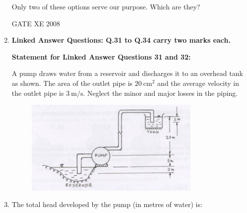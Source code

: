 \documentclass[12pt]{article}
\begin{document}
\begin{enumerate}[label=Q\arabic*.]
Only two of these options serve our purpose. Which are they?  

\begin{enumerate}[label=(\Alph*)]
\end{enumerate}

GATE XE 2008

\item[] \textbf{\Large Linked Answer Questions: Q.31 to Q.34 carry two marks each.}

\textbf{Statement for Linked Answer Questions 31 and 32:}  

A pump draws water from a reservoir and discharges it to an overhead tank as shown.  
The area of the outlet pipe is $20 \ \text{cm}^2$ and the average velocity in the outlet pipe is $3 \ \text{m/s}$.  
Neglect the minor and major losses in the piping.  

\begin{figure}[H]
\centering
  \includegraphics[width=0.8\textwidth]{figs/ass1_d_q31.png}
  \caption{}
\end{figure}

\item The total head developed by the pump (in metres of water) is:  

\begin{enumerate}[label=(\Alph*)]
\end{enumerate}


\end{enumerate}
\end{document}
